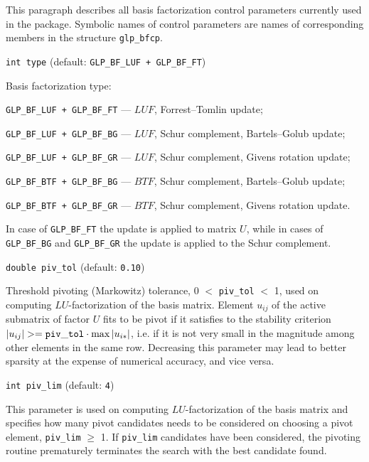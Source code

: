 \newpage


This paragraph describes all basis factorization control parameters
currently used in the package. Symbolic names of control parameters are
names of corresponding members in the structure \verb|glp_bfcp|.

\medskip

{\tt int type} (default: {\tt GLP\_BF\_LUF + GLP\_BF\_FT})

Basis factorization type:

\verb~GLP_BF_LUF + GLP_BF_FT~ --- $LUF$, Forrest--Tomlin update;

\verb~GLP_BF_LUF + GLP_BF_BG~ --- $LUF$, Schur complement,
Bartels--Golub update;

\verb~GLP_BF_LUF + GLP_BF_GR~ --- $LUF$, Schur complement,
Givens rotation update;

\verb~GLP_BF_BTF + GLP_BF_BG~ --- $BTF$, Schur complement,
Bartels--Golub update;

\verb~GLP_BF_BTF + GLP_BF_GR~ --- $BTF$, Schur complement,
Givens rotation update.

In case of \verb|GLP_BF_FT| the update is applied to matrix $U$, while
in cases of \verb|GLP_BF_BG| and \verb|GLP_BF_GR| the update is applied
to the Schur complement.

%
%

\medskip

{\tt double piv\_tol} (default: {\tt 0.10})

Threshold pivoting (Markowitz) tolerance, 0 $<$ \verb|piv_tol| $<$ 1,
used on computing $LU$-factoriza\-tion of the basis matrix. Element
$u_{ij}$ of the active submatrix of factor $U$ fits to be pivot if it
satisfies to the stability criterion
$|u_{ij}| >= {\tt piv\_tol}\cdot\max|u_{i*}|$, i.e. if it is not very
small in the magnitude among other elements in the same row. Decreasing
this parameter may lead to better sparsity at the expense of numerical
accuracy, and vice versa.

\medskip

{\tt int piv\_lim} (default: {\tt 4})

This parameter is used on computing $LU$-factorization of the basis
matrix and specifies how many pivot candidates needs to be considered
on choosing a pivot element, \verb|piv_lim| $\geq$ 1. If \verb|piv_lim|
candidates have been considered, the pivoting routine prematurely
terminates the search with the best candidate found.

